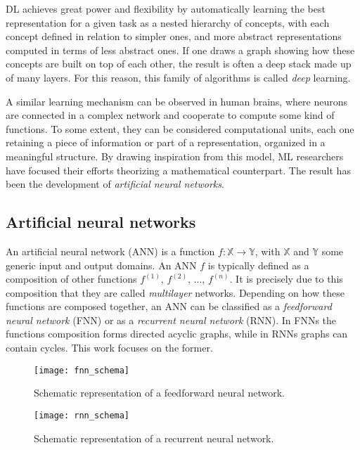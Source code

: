 DL achieves great power and flexibility by automatically learning the best representation for a given task as a nested hierarchy of concepts, with each concept defined in relation to simpler ones, and more abstract representations computed in terms of less abstract ones. If one draws a graph showing how these concepts are built on top of each other, the result is often a deep stack made up of many layers. For this reason, this family of algorithms is called \textit{deep} learning.

A similar learning mechanism can be observed in human brains, where neurons are connected in a complex network and cooperate to compute some kind of functions. To some extent, they can be considered computational units, each one retaining a piece of information or part of a representation, organized in a meaningful structure. By drawing inspiration from this model, ML researchers have focused their efforts theorizing a mathematical counterpart. The result has been the development of \textit{artificial neural networks}.



\subsection{Artificial neural networks}

An artificial neural network (ANN) is a function $f : \mathbb{X} \to \mathbb{Y}$, with $\mathbb{X}$ and $\mathbb{Y}$ some generic input and output domains. An ANN $f$ is typically defined as a composition of other functions $f^{(1)}$, $f^{(2)}$, ..., $f^{(n)}$. It is precisely due to this composition that they are called \textit{multilayer} networks. Depending on how these functions are composed together, an ANN can be classified as a \textit{feedforward neural network} (FNN) or as a \textit{recurrent neural network} (RNN). In FNNs the functions composition forms directed acyclic graphs, while in RNNs graphs can contain cycles. This work focuses on the former.

\begin{figure}[ht]
    \centering
    \begin{minipage}{0.4\textwidth}
        \centering
        \texttt{[image: fnn\_schema]}
        \caption{Schematic representation of a feedforward neural network.}
    \end{minipage}
    \hspace{0.5cm}
    \begin{minipage}{0.4\textwidth}
        \centering
        \texttt{[image: rnn\_schema]}
        \caption{Schematic representation of a recurrent neural network.}
    \end{minipage}
\end{figure}

